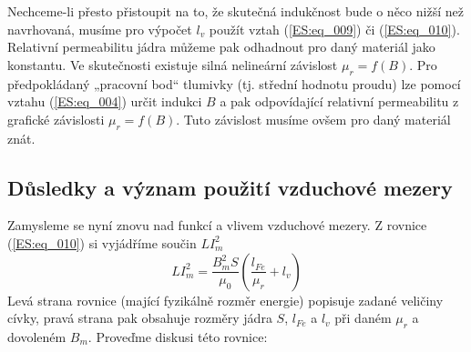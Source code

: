       Nechceme-li přesto přistoupit na to, že skutečná indukčnost bude o něco nižší než navrhovaná,
      musíme pro výpočet \(l_v\) použít vztah (\ref{ES:eq_009}) či (\ref{ES:eq_010}). Relativní 
      permeabilitu jádra můžeme pak odhadnout pro daný materiál jako konstantu. Ve skutečnosti 
      existuje silná nelineární závislost \(\mu_r = f(B)\). Pro předpokládaný „pracovní bod“ 
      tlumivky (tj. střední hodnotu proudu) lze pomocí vztahu (\ref{ES:eq_004}) určit indukci \(B\) 
      a pak odpovídající relativní permeabilitu z grafické závislosti \(\mu_r = f(B)\). Tuto 
      závislost musíme ovšem pro daný materiál znát.
      
    \subsection{Důsledky a význam použití vzduchové mezery}
      Zamysleme se nyní znovu nad funkcí a vlivem vzduchové mezery. Z rovnice (\ref{ES:eq_010}) si 
      vyjádříme součin \(LI_m^2\)
      \begin{equation}\label{ES:eq_012}
        LI_m^2 = \frac{B_m^2S}{\mu_0}\left(\frac{l_{Fe}}{\mu_r}+l_v\right)
      \end{equation}
      Levá strana rovnice (mající fyzikálně rozměr energie) popisuje zadané veličiny cívky, pravá 
      strana pak obsahuje rozměry jádra \(S\), \(l_{Fe}\) a \(l_v\) při daném \(\mu_r\) a dovoleném 
      \(B_m\). Proveďme diskusi této rovnice:
